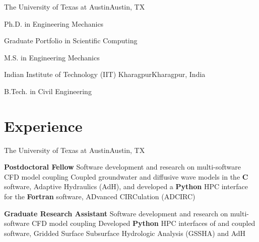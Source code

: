 \documentclass[letterpaper,10pt]{article}
\begin{document}
    \resumeSubheading
      {The University of Texas at Austin}{Austin, TX}

      \resumeSubSubheading
        {Ph.D. in Engineering Mechanics}{}

      \resumeSubSubheading
        {Graduate Portfolio in Scientific Computing}{}

      \resumeSubSubheading
        {M.S. in Engineering Mechanics}{}

    \resumeSubheading
      {Indian Institute of Technology (IIT) Kharagpur}{Kharagpur, India}

      \resumeSubSubheading
        {B.Tech. in Civil Engineering}{}

  \resumeSubHeadingListEnd

\section{Experience}
  \resumeSubHeadingListStart

    \resumeSubheading
      {The University of Texas at Austin}{Austin, TX}

      \resumeSubSubheading
        {\textbf{Postdoctoral Fellow}}{}
        \resumeItemListStart
            {Software development and research on multi-software CFD model
            coupling}
            {Coupled groundwater and diffusive wave models in the \textbf{C}
            software, Adaptive Hydraulics (AdH), and developed a \textbf{Python}
            HPC interface for the \textbf{Fortran} software, ADvanced
            CIRCulation (ADCIRC)}
        \resumeItemListEnd

      \resumeSubSubheading
       {\textbf{Graduate Research Assistant}}{}
       \resumeItemListStart
            {Software development and research on multi-software CFD model
            coupling}
            {Developed \textbf{Python} HPC interfaces of and coupled
            \textbf{\CC{}} software, Gridded Surface Subsurface Hydrologic
            Analysis (GSSHA) and AdH}
       \resumeItemListEnd
\end{document}
